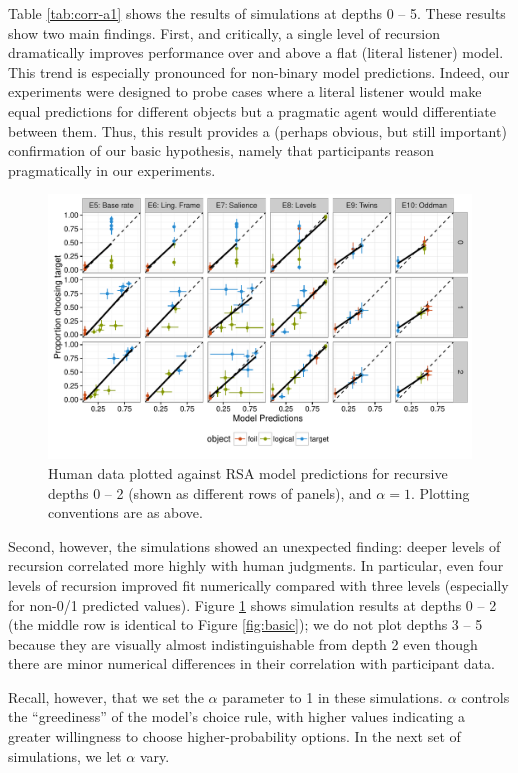 \documentclass[man,noapacite]{apa2}
\begin{document}
Table \ref{tab:corr-a1} shows the results of simulations at depths 0 -- 5. These results show two main findings. First, and critically, a single level of recursion dramatically improves performance over and above a flat (literal listener) model. This trend is especially pronounced for non-binary model predictions. Indeed, our experiments were designed to probe cases where a literal listener would make equal predictions for different objects but a pragmatic agent would differentiate between them. Thus, this result provides a (perhaps obvious, but still important) confirmation of our basic hypothesis, namely that participants reason pragmatically in our experiments.

\begin{figure}[t]
 \centering
 \includegraphics[width=6in]{../plots/model_depth.pdf}
 \caption{\label{fig:depths} Human data plotted against RSA model predictions for recursive depths 0 -- 2 (shown as different rows of panels), and $\alpha=1$. Plotting conventions are as above.}
\end{figure}

Second, however, the simulations showed an unexpected finding: deeper levels of recursion correlated more highly with human judgments. In particular, even four levels of recursion improved fit numerically compared with three levels (especially for non-0/1 predicted values). Figure \ref{fig:depths} shows simulation results at depths 0 -- 2 (the middle row is identical to Figure \ref{fig:basic}); we do not plot depths 3 -- 5 because they are visually almost indistinguishable from depth 2 even though there are minor numerical differences in their correlation with participant data.

Recall, however, that we set the $\alpha$ parameter to 1 in these simulations. $\alpha$ controls the ``greediness'' of the model's choice rule, with higher values indicating a greater willingness to choose higher-probability options. In the next set of simulations, we let $\alpha$ vary.
\end{document}
